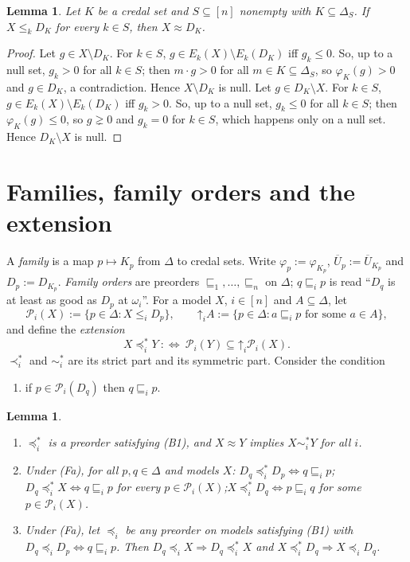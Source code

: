 \documentclass[11pt]{article}
\newtheorem{lemma}[theorem]{Lemma}
\theoremstyle{definition}
\newcommand{\Pc}{\mathcal P}
\newcommand{\Ub}{\overline U}
\newcommand{\up}{\mathord{\uparrow}}
\newcommand{\ws}{\preceq^{*}}
\newcommand{\wss}{\prec^{*}}
\newcommand{\wst}{\sim^{*}}
\begin{document}
\begin{lemma}\label{lem:faces}
Let $K$ be a credal set and $S\subseteq[n]$ nonempty with $K\subseteq\Delta_S$. If $X\le_kD_K$ for every $k\in S$, then $X\approx D_K$.
\end{lemma}

\begin{proof}
Let $g\in X\setminus D_K$. For $k\in S$, $g\in E_k(X)\setminus E_k(D_K)$ iff $g_k\le0$. So, up to a null set, $g_k>0$ for all $k\in S$; then $m\cdot g>0$ for all $m\in K\subseteq\Delta_S$, so $\varphi_K(g)>0$ and $g\in D_K$, a contradiction. Hence $X\setminus D_K$ is null. Let $g\in D_K\setminus X$. For $k\in S$, $g\in E_k(X)\setminus E_k(D_K)$ iff $g_k>0$. So, up to a null set, $g_k\le0$ for all $k\in S$; then $\varphi_K(g)\le0$, so $g\gneq0$ and $g_k=0$ for $k\in S$, which happens only on a null set. Hence $D_K\setminus X$ is null.
\end{proof}

\section{Families, family orders and the extension}\label{sec:extension}

A \emph{family} is a map $p\mapsto K_p$ from $\Delta$ to credal sets. Write $\varphi_p:=\varphi_{K_p}$, $\Ub_p:=\Ub_{K_p}$ and $D_p:=D_{K_p}$. \emph{Family orders} are preorders $\sqsubseteq_1,\dots,\sqsubseteq_n$ on $\Delta$; $q\sqsubseteq_ip$ is read ``$D_q$ is at least as good as $D_p$ at $\omega_i$''. For a model $X$, $i\in[n]$ and $A\subseteq\Delta$, let
\[
\Pc_i(X):=\{p\in\Delta:X\le_iD_p\},\qquad \up_iA:=\{p\in\Delta:a\sqsubseteq_ip\text{ for some }a\in A\},
\]
and define the \emph{extension}
\[
X\ws_iY\ :\iff\ \Pc_i(Y)\subseteq\up_i\Pc_i(X).
\]
$\wss_i$ and $\wst_i$ are its strict part and its symmetric part. Consider the condition
\begin{enumerate}[itemsep=0pt]
\item[\textbf{(Fa)}] if $p\in\Pc_i(D_q)$ then $q\sqsubseteq_ip$.
\end{enumerate}

\begin{lemma}\label{lem:extension}
\begin{enumerate}[label=(\alph*)]
\item $\ws_i$ is a preorder satisfying (B1), and $X\approx Y$ implies $X\wst_iY$ for all $i$.
\item Under (Fa), for all $p,q\in\Delta$ and models $X$:
$D_q\ws_iD_p\iff q\sqsubseteq_ip$;\quad $D_q\ws_iX\iff q\sqsubseteq_ip$ for every $p\in\Pc_i(X)$;\quad $X\ws_iD_q\iff p\sqsubseteq_iq$ for some $p\in\Pc_i(X)$.
\item Under (Fa), let $\preceq_i$ be any preorder on models satisfying (B1) with $D_q\preceq_iD_p\iff q\sqsubseteq_ip$. Then $D_q\preceq_iX\Rightarrow D_q\ws_iX$ and $X\ws_iD_q\Rightarrow X\preceq_iD_q$.
\end{enumerate}
\end{lemma}
\end{document}
